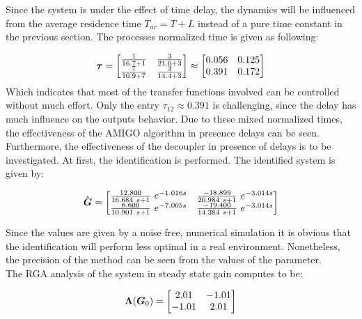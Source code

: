 Since the system is under the effect of time delay, the dynamics will be influenced from the average residence time $T_{ar} = T + L$ instead of a pure time constant in the previous section. The processes normalized time is given as following:

\begin{align*}
\mbox{\boldmath$\tau$} = \begin{bmatrix}
\frac{1}{16.7+1} & \frac{3}{21.0+3} \\
\frac{7}{10.9+7} & \frac{3}{14.4+3}
\end{bmatrix} \approx \begin{bmatrix} 
0.056 & 0.125 \\
0.391 & 0.172
\end{bmatrix}
\end{align*}
Which indicates that most of the transfer functions involved can be controlled without much effort. Only the entry $\tau_{12} \approx 0.391$ is challenging, since the delay has much influence on the outputs behavior. Due to these mixed normalized times, the effectiveness of the AMIGO algorithm in presence delays can be seen. Furthermore, the effectiveness of the decoupler in presence of delays is to be investigated. At first, the identification is performed. The identified system is given by:

\begin{align*}
\hat{\mbox{\boldmath$G$}} = \begin{bmatrix}
\frac{12.800}{16.684 ~s+1}~e^{-1.016s}  & \frac{-18.899}{20.984 ~s+1}~e^{-3.014s}\\
\frac{6.600}{10.901 ~s+1}~e^{-7.005s} & \frac{-19.400}{14.384 ~s+1}~e^{-3.014s}
\end{bmatrix}
\end{align*} 

Since the values are given by a noise free, numerical simulation it is obvious that the identification will perform less optimal in a real environment. Nonetheless, the precision of the method can be seen from the values of the parameter.\\

The RGA analysis of the system in steady state gain computes to be:

\begin{align*}
\mbox{\boldmath$\Lambda$}(\mbox{\boldmath$G$}_0) = \begin{bmatrix}
2.01 & -1.01 \\
-1.01 & 2.01
\end{bmatrix}
\end{align*} 

